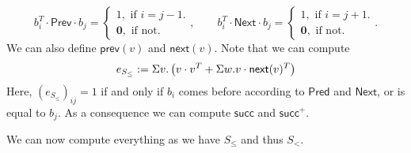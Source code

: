 $$
b_i^T\cdot \mathsf{Prev} \cdot b_j=\begin{cases}
               1, \text{ if } i = j-1.\\
              \mathbf{0}, \text{ if not.}
            \end{cases},
\hspace{2em}b_i^T\cdot \mathsf{Next} \cdot b_j=\begin{cases}
               1, \text{ if } i=j+1.\\
              \mathbf{0}, \text{ if not.}
            \end{cases}.
$$
We can also define $\mathsf{prev}(v)$ and $\mathsf{next}(v)$.
Note that we can compute
$$
e_{S_{\leq}}:=\Sigma v. \left( v\cdot v^T + \Sigma w. v\cdot\mathsf{next}(v)^T \right)
$$
Here, $(e_{S_{\leq}})_{ij}=1$ if and only if $b_i$ comes 
before according to $\mathsf{Pred}$ and $\mathsf{Next}$, or is equal to $b_j$. As a consequence we
can compute $\mathsf{succ}$ and $\mathsf{succ}^+$.

We can now compute everything as we have $S_{\leq}$ and thus $S_{<}$.







